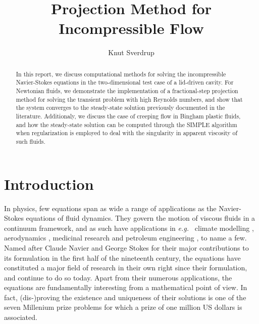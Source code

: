 \documentclass[final,3p,twocolumn]{elsarticle}
\begin{document}
\begin{frontmatter}

\title{Projection Method for Incompressible Flow}

\author{Knut Sverdrup}

\begin{abstract}
    In this report, we discuss computational methods for solving the
    incompressible Navier-Stokes equations in the two-dimensional test case of
    a lid-driven cavity. For Newtonian fluids, we demonstrate the
    implementation of a fractional-step projection method for solving the
    transient problem with high Reynolds numbers, and show that the system
    converges to the steady-state solution previously documented in the
    literature. Additionaly, we discuss the case of creeping flow in Bingham
    plastic fluids, and how the steady-state solution can be computed through
    the SIMPLE algorithm when regularization is employed to deal with the
    singularity in apparent viscosity of such fluids. 
\end{abstract}

\end{frontmatter}

\section{Introduction}
\label{sec:introduction}

In physics, few equations span as wide a range of applications as the
Navier-Stokes equations of fluid dynamics. They govern the motion of viscous
fluids in a continuum framework, and as such have applications in {\em e.g.\ }
climate modelling \cite{marshall1997finite, giraldo2008study}, aerodynamics
\cite{rai1987navier, thomas1990navier, jameson1998optimum}, medicinal research
\cite{peskin1977numerical, mihaescu2008large} and petroleum engineering
\cite{deiber1979flow, vinay2006numerical, cardenas2007navier, boyer2010cahn},
to name a few. Named after Claude Navier and George Stokes for their major
contributions \cite{navier1822memoire, stokes1845theories} to its formulation
in the first half of the nineteenth century, the equations have constituted a
major field of research in their own right since their formulation, and
continue to do so today. Apart from their numerous applications, the equations
are fundamentally interesting from a mathematical point of view. In fact,
(dis-)proving the existence and uniqueness of their solutions is one of the
seven Millenium prize problems \cite{fefferman2006existence} for which a prize
of one million US dollars is associated. 
\end{document}
